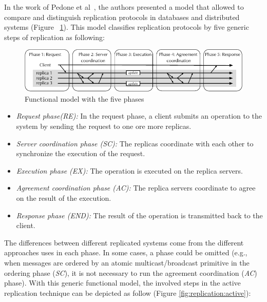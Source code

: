 In the work of Pedone et al~\cite{pedone:replication}, the authors presented a
model that allowed to compare and distinguish replication protocols in databases
and distributed systems (Figure ~\ref{fig:replication:org}). This model
classifies replication protocols by five generic steps of replication as
following:

\begin{figure}[ht!]
  \begin{minipage}[b]{1.0\linewidth}
  \centering
        \includegraphics[width=1\linewidth]{figures/replication-original}
  \end{minipage}
  \caption{Functional model with the five phases}
  \label{fig:replication:org}
\end{figure}

\begin{itemize}
  \item \textit{Request phase(RE):} In the request phase, a client submits an
     operation to the system by sending the request to one ore more replicas.
  \item \textit{Server coordination phase (SC):} The replicas coordinate
  with each other to synchronize the execution of the request.
  \item \textit{Execution phase (EX):} The operation is executed on the replica servers.
  \item \textit{Agreement coordination phase (AC):} The replica servers
  coordinate to agree on the result of the execution.
  \item \textit{Response phase (END):} The result of the operation is
  transmitted back to the client.
\end{itemize}

The differences between different replicated systems come from the different
approaches uses in each phase. In some cases, a phase could be omitted (e.g.,
when messages are ordered by an atomic multicast/broadcast primitive in the
ordering phase (\emph{SC}), it is not necessary to run the agreement
coordination (\emph{AC}) phase). With this generic functional model, the
involved steps in the active replication technique can be depicted as follow
(Figure \ref{fig:replication:active}):

